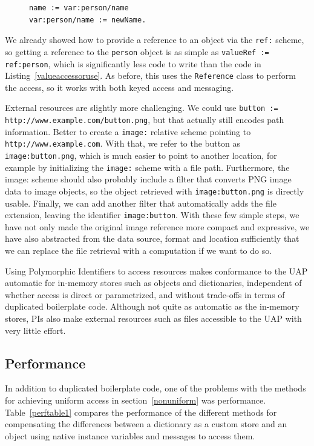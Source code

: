 \documentclass[preprint]{sigplanconf}
\begin{document}
\begin{figure}[htbp]
\begin{lstlisting}[style=numbers,label=pidictobj,caption=Accessing a dictionary or object via PI.]
name := var:person/name 
var:person/name := newName.
\end{lstlisting}
\end{figure}

We already showed how to provide a reference to an object via the {\tt ref:} scheme, so
getting a reference to the {\tt person} object is as simple as {\tt valueRef := ref:person}, which
is significantly less code to write than the code in Listing~\ref{valueaccessoruse}.  As before,
this uses the {\tt Reference} class to perform the access, so it works with both keyed access
and messaging.

External resources are slightly more challenging.  We could use {\tt button := http://www.example.com/button.png}, but that actually still encodes path information.  Better to create a {\tt image:} relative
scheme pointing to {\tt http://www.example.com}.  With that, we refer to the button as {\tt image:button.png},
which is much easier to point to another location, for example by initializing the {\tt image:} scheme
with a file path.  Furthermore, the {image:} scheme should also probably include a filter that converts
PNG image data to image objects, so the object retrieved with {\tt image:button.png} is directly
usable.  Finally, we can add another filter that automatically adds the file extension, leaving
the identifier {\tt image:button}.   With these few simple steps, we have not only made 
the original image reference more compact and expressive, we have also abstracted from
the data source, format and location sufficiently that we can replace the file retrieval with
a computation if we want to do so.

Using Polymorphic Identifiers to access resources makes conformance to the UAP automatic
for in-memory stores such as objects and dictionaries, independent of whether access is
direct or parametrized, and without trade-offs in terms of duplicated boilerplate code. Although
not quite as automatic as the in-memory stores, PIs also make external resources such as 
files accessible to the UAP with very little effort.  

\subsection{Performance}

In addition to duplicated boilerplate code, one of the problems with the methods for achieving
uniform access in section~\ref{nonuniform} was performance.  Table~\ref{perftable1} compares 
the performance of the different methods for compensating the differences between a dictionary
as a custom store and an object using native instance variables and messages to access them.
\end{document}
